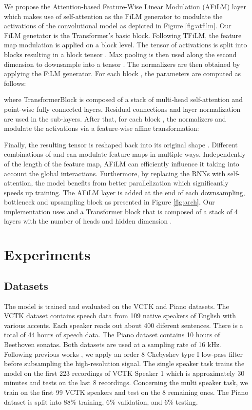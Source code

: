 \documentclass{article}
\begin{document}
We propose the Attention-based Feature-Wise Linear Modulation (AFiLM) layer which makes use of self-attention as the FiLM generator to modulate the activations of the convolutional model as depicted in Figure \ref{fig:atfilm}. Our FiLM genetator is the Transformer's \cite{vaswani2017attention} basic block. Following TFiLM, the feature map modulation is applied on a block level. The tensor of activations  is split into  blocks resulting in a block tensor . Max pooling is then used along the second dimension to downsample  into a tensor . The normalizers  are then obtained by applying the FiLM generator. For each block , the parameters are computed as follows:

where TransformerBlock is composed of a stack of multi-head self-attention and point-wise fully
connected layers. Residual connections and layer normalization \cite{ba2016layer} are used in the sub-layers. After that, for each block , the normalizers  and  modulate the activations via a feature-wise affine transformation:

Finally, the resulting tensor is reshaped back into its original shape . Different combinations of  and  can modulate feature maps in multiple ways. Independently of the length of the feature map, AFiLM can efficiently influence it taking into account the global interactions. Furthermore, by replacing the RNNs with self-attention, the model benefits from better parallelization which significantly speeds up training.  The AFiLM layer is added at the end of each downsampling, bottleneck and upsampling block as presented in Figure \ref{fig:arch}. Our implementation uses  and a Transformer block that is composed of a stack of 4 layers with the number of heads  and hidden dimension . 

\section{Experiments}
\label{sec:experiments}
\subsection{Datasets}
The model is trained and evaluated on the VCTK \cite{yamagishi2012english} and Piano \cite{mehri2016samplernn} datasets. The VCTK dataset contains speech data from 109 native speakers of English with various accents. Each speaker reads out about 400 diferent sentences. There is a total of 44 hours of speech data. The Piano dataset contains 10 hours of Beethoven sonatas. Both datasets are used at a sampling rate of 16 kHz. Following previous works \cite{kuleshov2017audio,birnbaum2019temporal}, we apply an order 8 Chebyshev type I low-pass filter before subsampling the high-resolution signal. The single speaker task trains the model on
the first 223 recordings of VCTK Speaker 1 which is approximately 30 minutes and tests on the last 8 recordings. Concerning the multi speaker task, we train on the first 99 VCTK speakers and test on the 8 remaining ones. The Piano dataset is split into
88\% training, 6\% validation, and 6\% testing.
\end{document}
